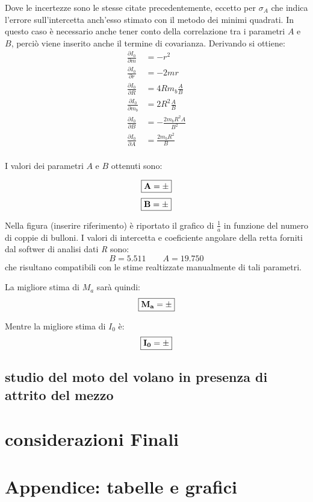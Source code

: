 \documentclass[10pt,oneside,a4paper]{article}
\begin{document}
 Dove le incertezze sono le stesse citate precedentemente, eccetto per $\sigma_A$ che indica l'errore sull'intercetta anch'esso stimato con il metodo dei minimi quadrati. In questo caso è necessario anche tener conto della correlazione tra i parametri $A$ e $B$, perciò viene inserito anche il termine di covarianza. Derivando si ottiene: 
 \begin{align*}\label{eq:partialI}
 \frac{\partial{I_0}}{ \partial m} &=-r^2 \\
 \frac{\partial{I_0}}{ \partial r} &=-2mr\\
 \frac{\partial{I_0}}{ \partial R} &= 4Rm_b \frac{A}{B}\\
 \frac{\partial{I_0}}{ \partial m_b} &= 2R^2 \frac{A}{B}\\
 \frac{\partial{I_0}}{ \partial B} &= -\frac{2m_bR^2 A}{B^2}\\
 \frac{\partial{I_0}}{ \partial A} &=\frac{2m_bR^2}{B} \\
\end{align*}

I valori dei parametri $A$ e $B$ ottenuti sono: 

\begin{equation}
\boxed{\bf{A = \pm }}
\end{equation}
\begin{equation}
\boxed{\bf{B = \pm }}
\end{equation}

Nella figura (inserire riferimento) è riportato il grafico di $\frac{1}{a}$ in funzione del numero di coppie di bulloni. I valori di intercetta e coeficiente angolare della retta forniti dal softwer di analisi dati \emph{R} sono: 
\begin{equation}
B = 5.511 \qquad A = 19.750
\end{equation}
che risultano compatibili con le stime realtizzate manualmente di tali parametri. 

La migliore stima di $M_a$ sarà quindi: 
\begin{equation}
\boxed{\bf{M_a = \pm }}
\end{equation}

Mentre la migliore stima di $I_0$ è: 
\begin{equation}
\boxed{\bf{I_0 = \pm }}
\end{equation}




\subsection{studio del moto del volano in presenza di attrito del mezzo}

\section{considerazioni Finali}

\pagebreak

\section{Appendice: tabelle e grafici}
\end{document}
